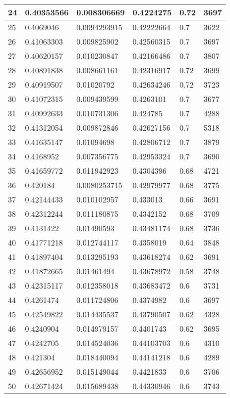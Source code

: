 \begin{longtable}{|l|l|l|l|l|l|}
24 & 0.40353566 & 0.008306669 & 0.4224275 & 0.72 & 3697 \\ \hline 
25 & 0.4069046 & 0.0094293915 & 0.42222664 & 0.7 & 3622 \\ \hline 
26 & 0.41063303 & 0.009825902 & 0.42560315 & 0.7 & 3697 \\ \hline 
27 & 0.40620157 & 0.010230847 & 0.42166486 & 0.7 & 3807 \\ \hline 
28 & 0.40891838 & 0.008661161 & 0.42316917 & 0.72 & 3699 \\ \hline 
29 & 0.40919507 & 0.01020792 & 0.42634246 & 0.72 & 3723 \\ \hline 
30 & 0.41072315 & 0.009439599 & 0.4263101 & 0.7 & 3677 \\ \hline 
31 & 0.40992633 & 0.010731306 & 0.424785 & 0.7 & 4288 \\ \hline 
32 & 0.41312054 & 0.009872846 & 0.42627156 & 0.7 & 5318 \\ \hline 
33 & 0.41635147 & 0.01094698 & 0.42806712 & 0.7 & 3879 \\ \hline 
34 & 0.4168952 & 0.007356775 & 0.42953324 & 0.7 & 3690 \\ \hline 
35 & 0.41659772 & 0.011942923 & 0.4304396 & 0.68 & 4721 \\ \hline 
36 & 0.420184 & 0.0080253715 & 0.42979977 & 0.68 & 3775 \\ \hline 
37 & 0.42144433 & 0.010102957 & 0.433013 & 0.66 & 3691 \\ \hline 
38 & 0.42312244 & 0.011180875 & 0.4342152 & 0.68 & 3709 \\ \hline 
39 & 0.4131422 & 0.01490593 & 0.43481174 & 0.68 & 3736 \\ \hline 
40 & 0.41771218 & 0.012744117 & 0.4358019 & 0.64 & 3848 \\ \hline 
41 & 0.41897404 & 0.013295193 & 0.43618274 & 0.62 & 3691 \\ \hline 
42 & 0.41872665 & 0.01461494 & 0.43678972 & 0.58 & 3748 \\ \hline 
43 & 0.42315117 & 0.012358018 & 0.43683472 & 0.6 & 3731 \\ \hline 
44 & 0.4261474 & 0.011724806 & 0.4374982 & 0.6 & 3697 \\ \hline 
45 & 0.42549822 & 0.014435537 & 0.43790507 & 0.62 & 4328 \\ \hline 
46 & 0.4240904 & 0.014979157 & 0.4401743 & 0.62 & 3695 \\ \hline 
47 & 0.4242705 & 0.014524036 & 0.44103703 & 0.6 & 4310 \\ \hline 
48 & 0.421304 & 0.018440094 & 0.44141218 & 0.6 & 4289 \\ \hline 
49 & 0.42656952 & 0.015149044 & 0.4421833 & 0.6 & 3706 \\ \hline 
50 & 0.42671424 & 0.015689438 & 0.44330946 & 0.6 & 3743 \\ \hline 
\end{longtable}